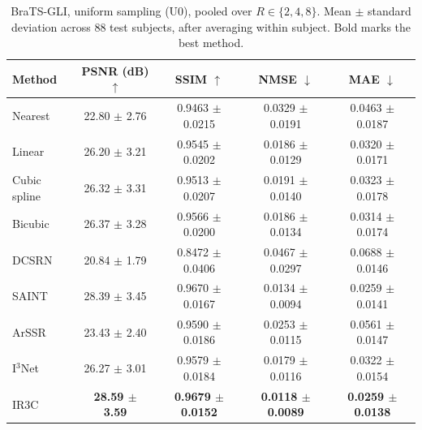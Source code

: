 \begin{table}[pos=!htbp]
\caption{BraTS-GLI, uniform sampling (U0), pooled over $R\in\{2,4,8\}$. Mean $\pm$ standard deviation across 88 test subjects, after averaging within subject. Bold marks the best method.}
\label{tab:detail-brats}
\small
\begin{tabular*}{\textwidth}{@{\extracolsep{\fill}}lcccc@{}}
\toprule
Method & PSNR (dB) $\uparrow$ & SSIM $\uparrow$ & NMSE $\downarrow$ & MAE $\downarrow$ \\
\midrule
Nearest & 22.80 $\pm$ 2.76 & 0.9463 $\pm$ 0.0215 & 0.0329 $\pm$ 0.0191 & 0.0463 $\pm$ 0.0187 \\
Linear & 26.20 $\pm$ 3.21 & 0.9545 $\pm$ 0.0202 & 0.0186 $\pm$ 0.0129 & 0.0320 $\pm$ 0.0171 \\
Cubic spline & 26.32 $\pm$ 3.31 & 0.9513 $\pm$ 0.0207 & 0.0191 $\pm$ 0.0140 & 0.0323 $\pm$ 0.0178 \\
Bicubic & 26.37 $\pm$ 3.28 & 0.9566 $\pm$ 0.0200 & 0.0186 $\pm$ 0.0134 & 0.0314 $\pm$ 0.0174 \\
DCSRN & 20.84 $\pm$ 1.79 & 0.8472 $\pm$ 0.0406 & 0.0467 $\pm$ 0.0297 & 0.0688 $\pm$ 0.0146 \\
SAINT & 28.39 $\pm$ 3.45 & 0.9670 $\pm$ 0.0167 & 0.0134 $\pm$ 0.0094 & 0.0259 $\pm$ 0.0141 \\
ArSSR & 23.43 $\pm$ 2.40 & 0.9590 $\pm$ 0.0186 & 0.0253 $\pm$ 0.0115 & 0.0561 $\pm$ 0.0147 \\
I$^3$Net & 26.27 $\pm$ 3.01 & 0.9579 $\pm$ 0.0184 & 0.0179 $\pm$ 0.0116 & 0.0322 $\pm$ 0.0154 \\
IR3C & \textbf{28.59 $\pm$ 3.59} & \textbf{0.9679 $\pm$ 0.0152} & \textbf{0.0118 $\pm$ 0.0089} & \textbf{0.0259 $\pm$ 0.0138} \\
\bottomrule
\end{tabular*}
\end{table}

